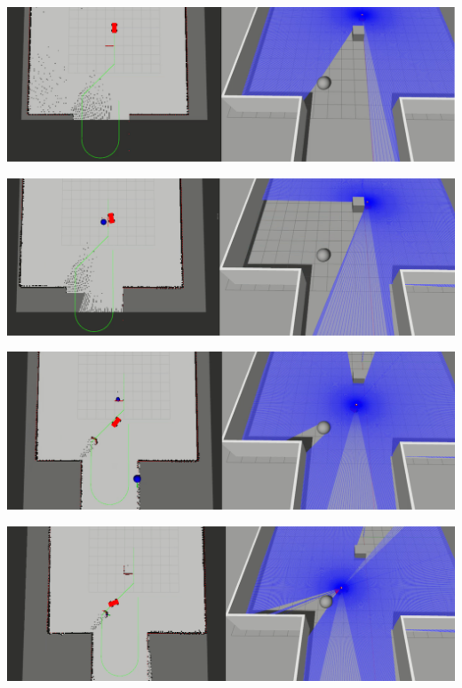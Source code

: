 \begin{center}
	\includegraphics[width=\textwidth]{figures/raw/local_planner_test_curved_traj_2_static_objects_1.png}

	\vspace{0.5cm}
	\includegraphics[width=\textwidth]{figures/raw/local_planner_test_curved_traj_2_static_objects_2.png}

	\vspace{0.5cm}
	\includegraphics[width=\textwidth]{figures/raw/local_planner_test_curved_traj_2_static_objects_3.png}

	\vspace{0.5cm}
	\includegraphics[width=\textwidth]{figures/raw/local_planner_test_curved_traj_2_static_objects_4.png}


\end{center}
